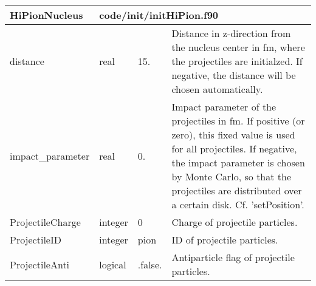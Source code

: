 \documentclass{article}
\begin{document}
\begin{longtable}{llll}
\toprule
\textbf{\large{HiPionNucleus}} & \multicolumn{3}{l}{\footnotesize{code/init/initHiPion.f90}}\\*
\midrule
\endfirsthead
\midrule
\endhead
distance & \begin{minipage}[t]{2cm}real\end{minipage} & \begin{minipage}[t]{2cm}15.\end{minipage} & \begin{minipage}[t]{12cm}Distance in z-direction from the nucleus center in fm, where the projectiles are initialzed. If negative, the distance will be chosen automatically.\end{minipage}\\*
\midrule
impact\_parameter & \begin{minipage}[t]{2cm}real\end{minipage} & \begin{minipage}[t]{2cm}0.\end{minipage} & \begin{minipage}[t]{12cm}Impact parameter of the projectiles in fm. If positive (or zero), this fixed value is used for all projectiles. If negative, the impact parameter is chosen by Monte Carlo, so that the projectiles are distributed over a certain disk. Cf. 'setPosition'.\end{minipage}\\*
\midrule
ProjectileCharge & \begin{minipage}[t]{2cm}integer\end{minipage} & \begin{minipage}[t]{2cm}0\end{minipage} & \begin{minipage}[t]{12cm}Charge of projectile particles.\end{minipage}\\*
\midrule
ProjectileID & \begin{minipage}[t]{2cm}integer\end{minipage} & \begin{minipage}[t]{2cm}pion\end{minipage} & \begin{minipage}[t]{12cm}ID of projectile particles.\end{minipage}\\*
\midrule
ProjectileAnti & \begin{minipage}[t]{2cm}logical\end{minipage} & \begin{minipage}[t]{2cm}.false.\end{minipage} & \begin{minipage}[t]{12cm}Antiparticle flag of projectile particles.\end{minipage}\\*

\end{longtable}
\end{document}
